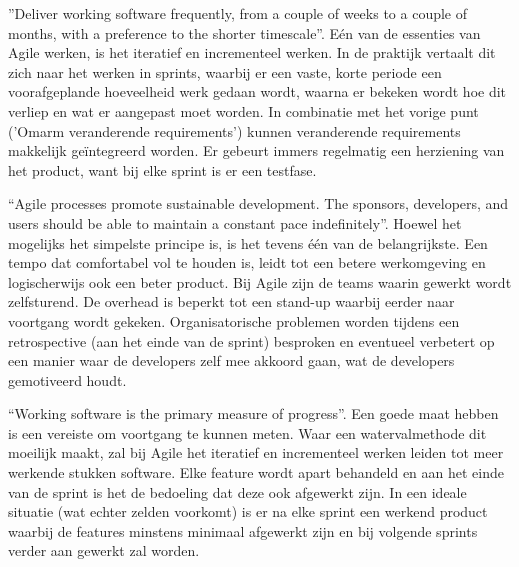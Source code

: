 ''Deliver working software frequently, from a
couple of weeks to a couple of months, with a
preference to the shorter timescale''\autocite{Beck2001}. Eén van de essenties van Agile werken, is het iteratief en incrementeel werken. In de praktijk vertaalt dit zich naar het werken in sprints, waarbij er een vaste, korte periode een voorafgeplande hoeveelheid werk gedaan wordt, waarna er bekeken wordt hoe dit verliep en wat er aangepast moet worden. In combinatie met het vorige punt ('Omarm veranderende requirements') kunnen veranderende requirements makkelijk geïntegreerd worden. Er gebeurt immers regelmatig een herziening van het product, want bij elke sprint is er een testfase.


``Agile processes promote sustainable development.
The sponsors, developers, and users should be able
to maintain a constant pace indefinitely''\autocite{Beck2001}. Hoewel het mogelijks het simpelste principe is, is het tevens één van de belangrijkste. Een tempo dat comfortabel vol te houden is, leidt tot een betere werkomgeving en logischerwijs ook een beter product. Bij Agile zijn de teams waarin gewerkt wordt zelfsturend. De overhead is beperkt tot een stand-up waarbij eerder naar voortgang wordt gekeken. Organisatorische problemen worden tijdens een retrospective (aan het einde van de sprint) besproken en eventueel verbetert op een manier waar de developers zelf mee akkoord gaan, wat de developers gemotiveerd houdt.

``Working software is the primary measure of progress''\autocite{Beck2001}. Een goede maat hebben is een vereiste om voortgang te kunnen meten. Waar een watervalmethode dit moeilijk maakt, zal bij Agile het iteratief en incrementeel werken leiden tot meer werkende stukken software. Elke feature wordt apart behandeld en aan het einde van de sprint is het de bedoeling dat deze ook afgewerkt zijn. In een ideale situatie (wat echter zelden voorkomt) is er na elke sprint een werkend product waarbij de features minstens minimaal afgewerkt zijn en bij volgende sprints verder aan gewerkt zal worden.

